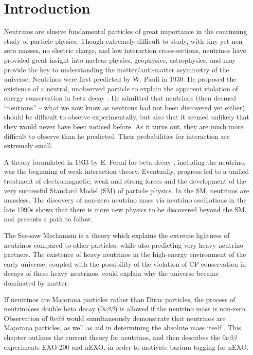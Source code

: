\chapter{Introduction}

Neutrinos are elusive fundamental particles of great importance in the continuing study of particle physics.  Though extremely difficult to study, with tiny yet non-zero masses, no electric charge, and low interaction cross-sections, neutrinos have provided great insight into nuclear physics, geophysics, astrophysics, and may provide the key to understanding the matter/anti-matter asymmetry of the universe.  Neutrinos were first predicted by W. Pauli in 1930.  He proposed the existence of a neutral, unobserved particle to explain the apparent violation of energy conservation in beta decay \cite{betaspectrum}. He admitted that neutrinos (then deemed ``neutrons'' -- what we now know as neutrons had not been discovered yet either) should be difficult to observe experimentally, but also that it seemed unlikely that they would never have been noticed before.  As it turns out, they are much more difficult to observe than he predicted.  Their probabilities for interaction are extremely small.

A theory formulated in 1933 by E. Fermi for beta decay \cite{FermiBetaDecay}, including the neutrino, was the beginning of weak interaction theory.  Eventually, progress led to a unified treatment of electromagnetic, weak and strong forces and the development of the very successful Standard Model (SM) of particle physics.  In the SM, neutrinos are massless.  The discovery of non-zero neutrino mass via neutrino oscillations in the late 1990s \cite{SuperK} shows that there is more new physics to be discovered beyond the SM, and presents a path to follow.

The See-saw Mechanism is a theory which explains the extreme lightness of neutrinos compared to other particles, while also predicting very heavy neutrino partners.  The existence of heavy neutrinos in the high-energy environment of the early universe, coupled with the possibility of the violation of CP conservation in decays of these heavy neutrinos, could explain why the universe became dominated by matter.  
\cite{SeeSaw}

If neutrinos are Majorana particles rather than Dirac particles, the process of neutrinoless double beta decay ($0\nu\beta\beta$) is allowed if the neutrino mass is non-zero.  Observation of $0\nu\beta\beta$ would simultaneously demonstrate that neutrinos are Majorana particles, as well as aid in determining the absolute mass itself \cite{effectiveMass}.  This chapter outlines the current theory for neutrinos, and then describes the $0\nu\beta\beta$ experiments EXO-200 and nEXO, in order to motivate barium tagging for nEXO.

